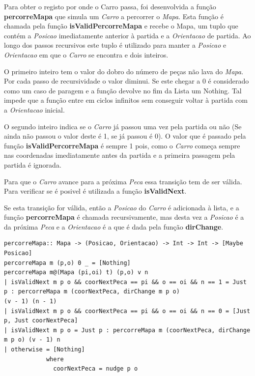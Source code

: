 \documentclass[a4paper]{report} %
\begin{document}
Para obter o registo por onde o Carro passa, foi desenvolvida a função \textbf{percorreMapa} que simula um \emph{Carro} a percorrer o \emph{Mapa}. Esta função é chamada pela função \textbf{isValidPercorreMapa} e recebe o Mapa, um tuplo que contém a \emph{Posicao} imediatamente anterior à partida e a \emph{Orientacao} de partida. Ao longo dos passos recursivos este tuplo é utilizado para manter a  \emph{Posicao} e \emph{Orientacao} em que o \emph{Carro} se encontra e dois inteiros.

O primeiro inteiro tem o valor do dobro do número de peças não lava do \emph{Mapa}. Por cada passo de recursividade o valor diminui. Se este chegar a 0 é considerado como um caso de paragem e a função devolve no fim da Lista um Nothing. Tal impede que a função entre em ciclos infinitos sem conseguir voltar à partida com a \emph{Orientacao} inicial.

O segundo inteiro indica se o \emph{Carro} já passou uma vez pela partida ou não (Se ainda não passou o valor deste é 1, se já passou é 0). O valor que é passado pela função \textbf{isValidPercorreMapa} é sempre 1 pois, como o \emph{Carro} começa sempre nas coordenadas imediatamente antes da partida e a primeira passagem pela partida é ignorada.

Para que o \emph{Carro} avance para a próxima \emph{Peca} essa transição tem de ser válida. Para verificar se é posivel é utilizada a função \textbf{isValidNext}.

Se esta transição for válida, então a \emph{Posicao} do \emph{Carro} é adicionada à lista, e a função \textbf{percorreMapa} é chamada recursivamente, mas desta vez a \emph{Posicao} é a da próxima \emph{Peca} e a \emph{Orientacao}
é a que é dada pela função \textbf{dirChange}.

\newpage

\scriptsize

\begin{verbatim}
percorreMapa:: Mapa -> (Posicao, Orientacao) -> Int -> Int -> [Maybe Posicao]
percorreMapa m (p,o) 0 _ = [Nothing]
percorreMapa m@(Mapa (pi,oi) t) (p,o) v n 
| isValidNext m p o && coorNextPeca == pi && o == oi && n == 1 = Just p : percorreMapa m (coorNextPeca, dirChange m p o) 
(v - 1) (n - 1)
| isValidNext m p o && coorNextPeca == pi && o == oi && n == 0 = [Just p, Just coorNextPeca]
| isValidNext m p o = Just p : percorreMapa m (coorNextPeca, dirChange m p o) (v - 1) n
| otherwise = [Nothing]
            where
              coorNextPeca = nudge p o


\end{verbatim} 
\end{document}
